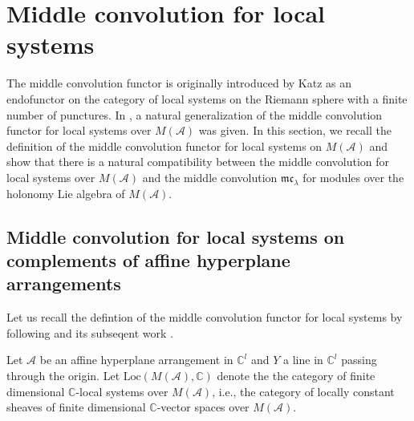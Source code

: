 \documentclass[a4paper,12pt]{article}
\newcommand{\C}{\mathbb{C}}
\theoremstyle{definition}
\theoremstyle{remark}
\begin{document}
\section{Middle convolution for local systems}\label{sec:RH}
The middle convolution functor is originally introduced by Katz \cite{Katz} as an endofunctor on the category of local systems on the Riemann sphere with a finite number of punctures.
In \cite{AdaHir}, a natural generalization of the middle convolution functor for local systems over $M(\mathcal{A})$ was given.
In this section, 
we recall the definition of the middle convolution functor for local systems on $M(\mathcal{A})$ and
show that there is a natural compatibility between the middle convolution 
for local systems over $M(\mathcal{A})$ and the middle convolution $\mathfrak{mc}_{\lambda}$ 
for modules over the holonomy Lie algebra of $M(\mathcal{A})$.
\subsection{Middle convolution for local systems on complements of affine hyperplane arrangements}\label{sec:MCforLoc}
Let us recall the defintion of the middle convolution functor for local systems
by following \cite{Katz} and its subseqent work \cite{AdaHir}. 

Let $\mathcal{A}$ be an affine hyperplane arrangement in $\C^{l}$ and $Y$ a line in $\C^{l}$ passing through the origin.
Let $\mathrm{Loc}(M(\mathcal{A}),\mathbb{C})$ denote the 
the category of finite dimensional $\mathbb{C}$-local systems over $M(\mathcal{A})$, i.e., the category of
locally constant sheaves of  finite dimensional $\mathbb{C}$-vector spaces over $M(\mathcal{A})$.
\end{document}
